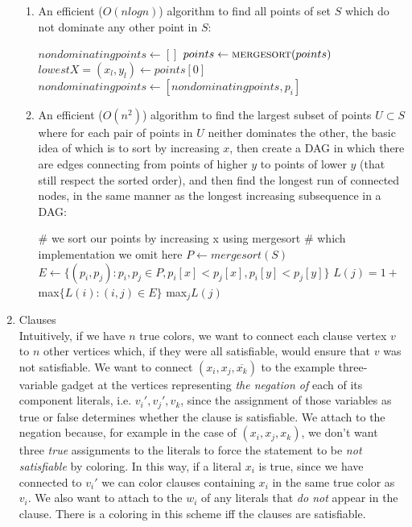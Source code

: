\documentclass[a4paper]{article}
\begin{document}
\begin{enumerate}
\begin{enumerate}
	\item An efficient ($O(nlogn)$) algorithm to find all points of set $S$ which do not dominate any other point in $S$:
		\begin{algorithmic}
		\State $nondominatingpoints \gets []$
		\State $points \gets \Call{mergesort}{points}$
		\State $lowestX = (x_l, y_l) \gets points[0]$
				\State $nondominatingpoints \gets [nondominatingpoints, p_i]$
			\EndIf
		\EndFor
		\end{algorithmic}
	\item An efficient ($O(n^2)$) algorithm to find the largest subset of points $U \subset S$ where for each pair of points in $U$ neither dominates the other, the basic idea of which is to sort by increasing $x$, then create a DAG in which there are edges connecting from points of higher $y$ to points of lower $y$ (that still respect the sorted order), and then find the longest run of connected nodes, in the same manner as the longest increasing subsequence in a DAG:
		\begin{algorithmic}
		\State \# we sort our points by increasing x using mergesort
		\State \# which implementation we omit here
		\State $P \gets mergesort(S)$
		\State $E \gets \{(p_i, p_j): p_i, p_j \in P, p_i[x] < p_j[x], p_i[y] < p_j[y]\}$
		\For{$j = 1, 2, ..., n:$}
			\State $L(j) = 1 + $max$\{L(i) : (i, j) \in E\}$
		\EndFor
		\State \Return max$_j L(j)$
		\end{algorithmic}
	\end{enumerate}
\item Clauses\\
	  Intuitively, if we have $n$ true colors, we want to connect each clause vertex $v$ to $n$ other vertices which, if they were all satisfiable, would ensure that $v$ was not satisfiable.  We want to connect $(x_i, x_j, \overline{x_k})$ to the example three-variable gadget at the vertices representing \emph{the negation of} each of its component literals, i.e. $v_i ', v_j ', v_k$, since the assignment of those variables as true or false determines whether the clause is satisfiable.  We attach to the negation because, for example in the case of $(x_i , x_j , x_k)$, we don't want three \emph{true} assignments to the literals to force the statement to be \emph{not satisfiable} by coloring.  In this way, if a literal $x_i$ is true, since we have connected to $v_i '$ we can color clauses containing $x_i$ in the same true color as $v_i$.  We also want to attach to the $w_i$ of any literals that \emph{do not} appear in the clause.  There is a coloring in this scheme iff the clauses are satisfiable.

\end{enumerate}
\end{document}
